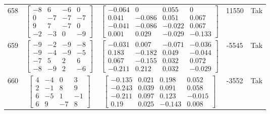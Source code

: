 \documentclass[a4paper,12pt]{article}
\begin{document}
\begin{tabular}{c c c c c}
658
&
$\begin{bmatrix} -8 & 6 & -6 & 0 \\ 0 & -7 & -7 & -7 \\ 9 & 7 & -7 & 0 \\ -2 & -3 & 0 & -9 \end{bmatrix}$
&
$\begin{bmatrix} -0.064 & 0 & 0.055 & 0 \\ 0.041 & -0.086 & 0.051 & 0.067 \\ -0.041 & -0.086 & -0.022 & 0.067 \\ 0.001 & 0.029 & -0.029 & -0.133 \end{bmatrix}$
&
11550
&
Tak
\\
659
&
$\begin{bmatrix} -9 & -2 & -9 & -8 \\ -9 & -4 & -9 & -5 \\ -7 & 5 & 2 & 6 \\ -8 & -9 & 2 & -6 \end{bmatrix}$
&
$\begin{bmatrix} -0.031 & 0.007 & -0.071 & -0.036 \\ 0.183 & -0.182 & 0.049 & -0.044 \\ 0.067 & -0.155 & 0.032 & 0.072 \\ -0.211 & 0.212 & 0.032 & -0.029 \end{bmatrix}$
&
-5545
&
Tak
\\
660
&
$\begin{bmatrix} 4 & -4 & 0 & 3 \\ 2 & -1 & 8 & 9 \\ 6 & -5 & 1 & -1 \\ 6 & 9 & -7 & 8 \end{bmatrix}$
&
$\begin{bmatrix} -0.135 & 0.021 & 0.198 & 0.052 \\ -0.243 & 0.039 & 0.091 & 0.058 \\ -0.211 & 0.097 & 0.123 & -0.015 \\ 0.19 & 0.025 & -0.143 & 0.008 \end{bmatrix}$
&
-3552
&
Tak
\\
\end{tabular} \egroup \newpage
\end{document}

